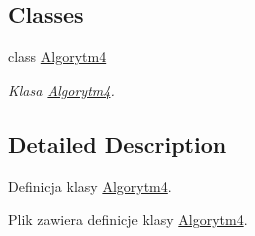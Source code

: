 \subsection*{Classes}
\begin{DoxyCompactItemize}
\item 
class \hyperlink{a00005}{Algorytm4}
\begin{DoxyCompactList}\small\item\em Klasa \hyperlink{a00005}{Algorytm4}. \end{DoxyCompactList}\end{DoxyCompactItemize}


\subsection{Detailed Description}
Definicja klasy \hyperlink{a00005}{Algorytm4}. 

Plik zawiera definicje klasy \hyperlink{a00005}{Algorytm4}. 
